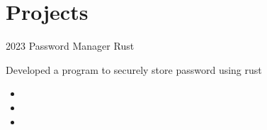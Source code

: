 \documentclass[]{cv-style}
\begin{document}
\section{Projects}
\begin{entrylist}

\entry
{2023}
{Password Manager}
{Rust}
{Developed a program to securely store password using rust\\
\begin{itemize}
    \item 
    \item 
    \item 
\end{itemize}}


\end{entrylist}
\end{document}
